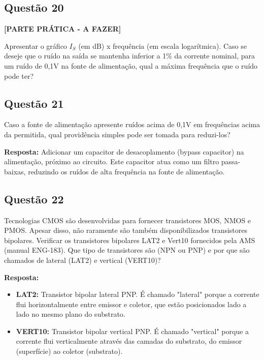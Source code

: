 \documentclass[12pt,a4paper]{article}
\begin{document}
\subsection*{Questão 20}

\textbf{[PARTE PRÁTICA - A FAZER]}

Apresentar o gráfico $I_S$ (em dB) x frequência (em escala logarítmica). Caso se deseje que o ruído na saída se mantenha inferior a 1\% da corrente nominal, para um ruído de 0,1V na fonte de alimentação, qual a máxima frequência que o ruído pode ter?

\subsection*{Questão 21}

Caso a fonte de alimentação apresente ruídos acima de 0,1V em frequências acima da permitida, qual providência simples pode ser tomada para reduzi-los?

\textbf{Resposta:} Adicionar um capacitor de desacoplamento (bypass capacitor) na alimentação, próximo ao circuito. Este capacitor atua como um filtro passa-baixas, reduzindo os ruídos de alta frequência na fonte de alimentação.

\subsection*{Questão 22}

Tecnologias CMOS são desenvolvidas para fornecer transistores MOS, NMOS e PMOS. Apesar disso, não raramente são também disponibilizados transistores bipolares. Verificar os transistores bipolares LAT2 e Vert10 fornecidos pela AMS (manual ENG-183). Que tipo de transistores são (NPN ou PNP) e por que são chamados de lateral (LAT2) e vertical (VERT10)?

\textbf{Resposta:} 
\begin{itemize}
    \item \textbf{LAT2:} Transistor bipolar lateral PNP. É chamado "lateral" porque a corrente flui horizontalmente entre emissor e coletor, que estão posicionados lado a lado no mesmo plano do substrato.
    \item \textbf{VERT10:} Transistor bipolar vertical PNP. É chamado "vertical" porque a corrente flui verticalmente através das camadas do substrato, do emissor (superfície) ao coletor (substrato).
\end{itemize}
\end{document}
